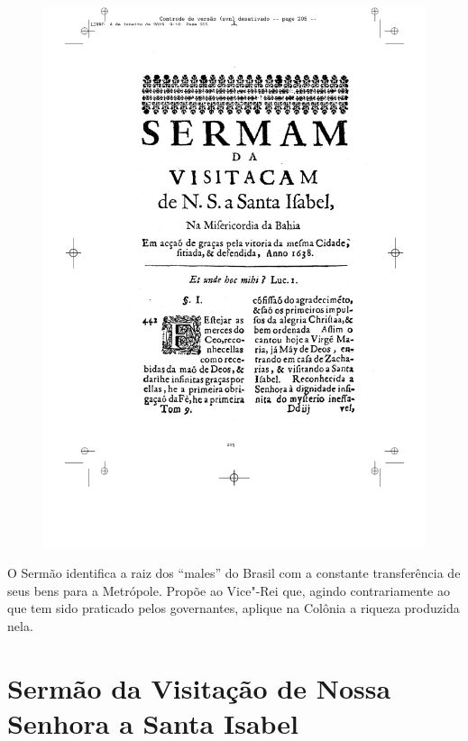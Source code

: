 \pagebreak
\thispagestyle{empty}
\movetooddpage
\thispagestyle{empty}
\begin{figure}[ht]
\includegraphics[width=\textwidth]{./imgs/visitacao.pdf}  
\end{figure}

\pagebreak
\movetoevenpage
\thispagestyle{empty}
\mbox{}\vfill
\noindent{}O Sermão identifica a raiz dos ``males'' do Brasil com a constante transferência de seus bens para a Metrópole. Propõe ao Vice"-Rei que, agindo contrariamente ao que tem sido praticado pelos governantes, aplique na Colônia a riqueza produzida nela.

\chapter[Sermão da Visitação de Nossa Senhora a Santa Isabel]{Sermão da Visitação de Nossa\\ Senhora a Santa Isabel}

